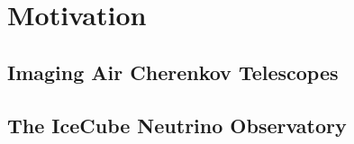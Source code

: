\chapter{Motivation}

\section{Imaging Air Cherenkov Telescopes}

\section{The IceCube Neutrino Observatory}

